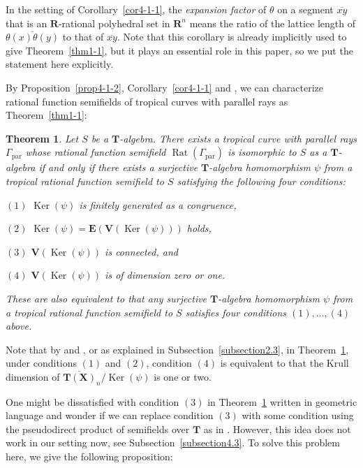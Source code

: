 \documentclass[a4paper,12pt]{amsart}
\newtheorem{thm}[dfn]{Theorem}
\def\Gamma{\varGamma}
\begin{document}
In the setting of Corollary~\ref{cor4-1-1}, the \textit{expansion factor} of $\theta$ on a segment $\overline{xy}$ that is an $\boldsymbol{R}$-rational polyhedral set in $\boldsymbol{R}^n$ means the ratio of the lattice length of $\overline{\theta(x)\theta(y)}$ to that of $\overline{xy}$.
Note that this corollary is already implicitly used to give Theorem~\ref{thm1-1}, but it plays an essential role in this paper, so we put the statement here explicitly.

By Proposition~\ref{prop4-1-2}, Corollary~\ref{cor4-1-1} and \cite[Theorem~3.14]{JuAe4}, we can characterize rational function semifields of tropical curves with parallel rays as Theorem~\ref{thm1-1}:

\begin{thm}
    \label{thm4-1-1}
Let $S$ be a $\boldsymbol{T}$-algebra.
There exists a tropical curve with parallel rays $\Gamma_{\operatorname{par}}$ whose rational function semifield $\operatorname{Rat}(\Gamma_{\operatorname{par}})$ is isomorphic to $S$ as a $\boldsymbol{T}$-algebra if and only if there exists a surjective $\boldsymbol{T}$-algebra homomorphism $\psi$ from a tropical rational function semifield to $S$ satisfying the following four conditions:

$(1)$ $\operatorname{Ker}(\psi)$ is finitely generated as a congruence,

$(2)$ $\operatorname{Ker}(\psi) = \boldsymbol{E}(\boldsymbol{V}(\operatorname{Ker}(\psi)))$ holds,

$(3)$ $\boldsymbol{V}(\operatorname{Ker}(\psi))$ is connected, and

$(4)$ $\boldsymbol{V}(\operatorname{Ker}(\psi))$ is of dimension zero or one.

These are also equivalent to that any surjective $\boldsymbol{T}$-algebra homomorphism $\psi$ from a tropical rational function semifield to $S$ satisfies four conditions $(1), \ldots, (4)$ above.
\end{thm}

Note that by \cite[Theorem~1.1]{JuAe5} and \cite[Corollary~3.30]{JuAe=Nakajima}, or as explained in Subsection~\ref{subsection2.3}, in Theorem~\ref{thm4-1-1}, under conditions $(1)$ and $(2)$, condition $(4)$ is equivalent to that the Krull dimension of $\overline{\boldsymbol{T}(\boldsymbol{X})}_n / \operatorname{Ker}(\psi)$ is one or two.

One might be dissatisfied with condition $(3)$ in Theorem~\ref{thm4-1-1} written in geometric language and wonder if we can replace condition $(3)$ with some condition using the pseudodirect product of semifields over $\boldsymbol{T}$ as in \cite[Section~3]{JuAe=Nakajima}.
However, this idea does not work in our setting now, see Subsection~\ref{subsection4.3}.
To solve this problem here, we give the following proposition:
\end{document}
